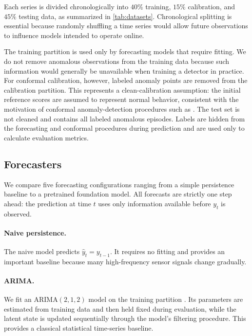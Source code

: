 \documentclass[11pt]{article}
\theoremstyle{definition}
\theoremstyle{remark}
\newcommand{\yhat}{\hat{y}}
\begin{document}
Each series is divided chronologically into $40\%$ training, $15\%$ calibration, and $45\%$ testing data, as summarized in \cref{tab:datasets}. Chronological splitting is essential because randomly shuffling a time series would allow future observations to influence models intended to operate online.

The training partition is used only by forecasting models that require fitting. We do not remove anomalous observations from the training data because such information would generally be unavailable when training a detector in practice. For conformal calibration, however, labeled anomaly points are removed from the calibration partition. This represents a clean-calibration assumption: the initial reference scores are assumed to represent normal behavior, consistent with the motivation of conformal anomaly-detection procedures such as \cite{bates2023testing}. The test set is not cleaned and contains all labeled anomalous episodes. Labels are hidden from the forecasting and conformal procedures during prediction and are used only to calculate evaluation metrics.

\begin{table}[t]
\centering\small
\caption{The five NAB \emph{realKnownCause} series. Splits are chronological:
$40\%$ train, $15\%$ calibration, $45\%$ test.}
\label{tab:datasets}

\end{table}

\subsection{Forecasters}

We compare five forecasting configurations ranging from a simple persistence baseline to a pretrained foundation model. All forecasts are strictly one step ahead: the prediction at time $t$ uses only information available before $y_t$ is observed.

\paragraph{Naive persistence.}
The naive model predicts $\yhat_t = y_{t-1}$. It requires no fitting and provides an important baseline because many high-frequency sensor signals change gradually.

\paragraph{ARIMA.}
We fit an ARIMA$(2,1,2)$ model on the training partition \cite{box2015time}. Its parameters are estimated from training data and then held fixed during evaluation, while the latent state is updated sequentially through the model's filtering procedure. This provides a classical statistical time-series baseline.
\end{document}
